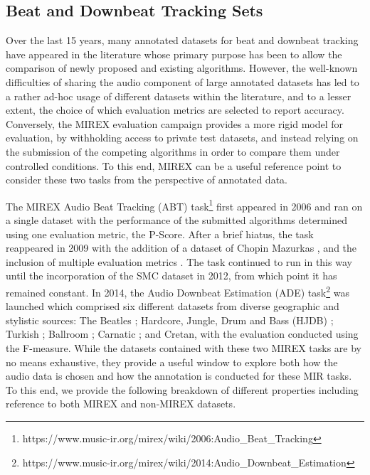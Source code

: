 \subsection{Beat and Downbeat Tracking Sets}

Over the last 15 years, many annotated datasets for beat and downbeat tracking have appeared in the literature whose primary purpose has been to allow the comparison of newly proposed and existing algorithms. However, the well-known difficulties of sharing the audio component of large annotated datasets has led to a rather ad-hoc usage of different datasets within the literature, and to a lesser extent, the choice of which evaluation metrics are selected to report accuracy. Conversely, the MIREX evaluation campaign provides a more rigid model for evaluation, by withholding access to private test datasets, and instead relying on the submission of the competing algorithms in order to compare them under controlled conditions. To this end, MIREX can be a useful reference point to consider these two tasks from the perspective of annotated data.  

The MIREX Audio Beat Tracking (ABT) task\footnote{https://www.music-ir.org/mirex/wiki/2006:Audio\_Beat\_Tracking} first appeared in 2006 and ran on a single dataset \cite{moelants04icmpc,mckinney07jnmr} with the performance of the submitted algorithms determined using one evaluation metric, the P-Score. After a brief hiatus, the task reappeared in 2009 with the addition of a dataset of Chopin Mazurkas \cite{sapp07ismir}, and the inclusion of multiple evaluation metrics \cite{davies09techreport}. The task continued to run in this way until the incorporation of the SMC dataset \cite{holzapfel12taslp} in 2012, from which point it has remained constant. In 2014, the Audio Downbeat Estimation (ADE) task\footnote{https://www.music-ir.org/mirex/wiki/2014:Audio\_Downbeat\_Estimation} was launched which comprised six different datasets from diverse geographic and stylistic sources: The Beatles \cite{Mauch2009a}; Hardcore, Jungle, Drum and Bass (HJDB) \cite{hockman12ismir}; Turkish \cite{srinivasamurthy14jnmr}; Ballroom \cite{krebs13ismir}; Carnatic \cite{srinivasamurthy14icassp}; and Cretan, with the evaluation conducted using the F-measure. While the datasets contained with these two MIREX tasks are by no means exhaustive, they provide a useful window to explore both how the audio data is chosen and how the annotation is conducted for these MIR tasks. To this end, we provide the following breakdown of different properties including reference to both MIREX and non-MIREX datasets. 


